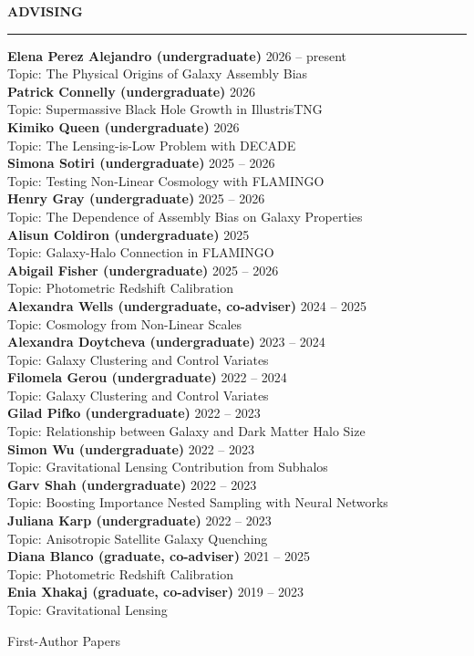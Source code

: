 \documentclass[12pt]{article}
\renewenvironment{section}[1]
  {
  \medskip
  {\color{aublue} \MakeUppercase{\bf #1}}
  \smallskip
  \hrule
  \medskip
  \begin{adjustwidth}{0.3cm}{}
  }
  {
  \end{adjustwidth}
  }
\newenvironment{ref-section}[1]
  {
  \medskip
  {\color{aublue} \MakeUppercase{\bf #1}}
  \smallskip
  \hrule
  \medskip
  \begin{refsection}
  }
  {
  \end{refsection}
  }
\newcommand{\entry}[3]{{\bf #1} \hfill {#2} \\ {#3}}
\begin{document}
\begin{section}{Advising}
  \entry{Elena Perez Alejandro (undergraduate)}{2026 -- present}{Topic: The Physical Origins of Galaxy Assembly Bias} \\
  \entry{Patrick Connelly (undergraduate)}{2026}{Topic: Supermassive Black Hole Growth in IllustrisTNG} \\
  \entry{Kimiko Queen (undergraduate)}{2026}{Topic: The Lensing-is-Low Problem with DECADE} \\
  \entry{Simona Sotiri (undergraduate)}{2025 -- 2026}{Topic: Testing Non-Linear Cosmology with FLAMINGO} \\
  \entry{Henry Gray (undergraduate)}{2025 -- 2026}{Topic: The Dependence of Assembly Bias on Galaxy Properties} \\
  \entry{Alisun Coldiron (undergraduate)}{2025}{Topic: Galaxy-Halo Connection in FLAMINGO} \\
  \entry{Abigail Fisher (undergraduate)}{2025 -- 2026}{Topic: Photometric Redshift Calibration} \\
  \entry{Alexandra Wells (undergraduate, co-adviser)}{2024 -- 2025}{Topic: Cosmology from Non-Linear Scales} \\
  \entry{Alexandra Doytcheva (undergraduate)}{2023 -- 2024}{Topic: Galaxy Clustering and Control Variates} \\
  \entry{Filomela Gerou (undergraduate)}{2022 -- 2024}{Topic: Galaxy Clustering and Control Variates} \\
  \entry{Gilad Pifko (undergraduate)}{2022 -- 2023}{Topic: Relationship between Galaxy and Dark Matter Halo Size} \\
  \entry{Simon Wu (undergraduate)}{2022 -- 2023}{Topic: Gravitational Lensing Contribution from Subhalos} \\
  \entry{Garv Shah (undergraduate)}{2022 -- 2023}{Topic: Boosting Importance Nested Sampling with Neural Networks} \\
  \entry{Juliana Karp (undergraduate)}{2022 -- 2023}{Topic: Anisotropic Satellite Galaxy Quenching} \\
  \entry{Diana Blanco (graduate, co-adviser)}{2021 -- 2025}{Topic: Photometric Redshift Calibration} \\
  \entry{Enia Xhakaj (graduate, co-adviser)}{2019 -- 2023}{Topic: Gravitational Lensing} \\
\end{section}

\begin{ref-section}{First-Author Papers}
  \nocite{Lange2026_ApJ_998_263, Lange2025_arXiv_2512_5962, Lange2024_OJAp_7_57, Lange2023_MNRAS_525_3181, Lange2023_MNRAS_520_5373, Lange2022_MNRAS_509_1779, Lange2021_MNRAS_502_2074, Lange2019_MNRAS_490_1870, Lange2019_MNRAS_488_5771, Lange2019_MNRAS_487_3112, Lange2019_MNRAS_482_4824, Lange2018_MNRAS_473_2830, Lange2016_ApJ_819_4, Lange2015_MNRAS_447_939, Lange2013_AA_551_89}
  \printbibliography[heading=none]
\end{ref-section}
\end{document}
